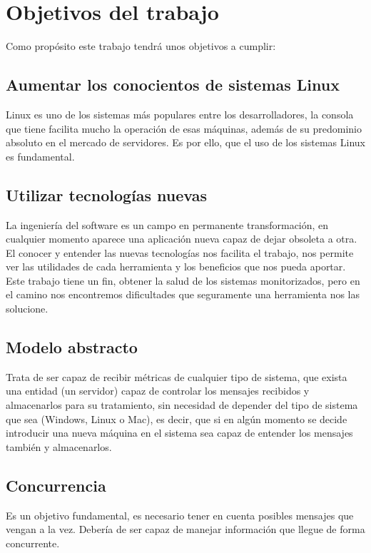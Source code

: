 \documentclass[ spanish, a4paper, 12pt, oneside]{report}
\begin{document}
\section{Objetivos del trabajo}
Como propósito este trabajo tendrá unos objetivos a cumplir:\\

\subsection{Aumentar los conocientos de sistemas Linux}
Linux es uno de los sistemas más populares entre los desarrolladores, la consola que tiene facilita mucho la operación de esas 
máquinas, además de su predominio absoluto en el mercado de servidores. Es por ello, que el uso de los sistemas Linux es fundamental.\\

\subsection{Utilizar tecnologías nuevas}
La ingeniería del software es un campo en permanente transformación, en cualquier momento aparece una aplicación nueva capaz de dejar obsoleta a otra. 
El conocer y entender las nuevas tecnologías nos facilita el trabajo, nos permite ver las utilidades de cada herramienta y los
beneficios que nos pueda aportar. \\

Este trabajo tiene un fin, obtener la salud de los sistemas monitorizados, pero en el camino nos encontremos dificultades que 
seguramente una herramienta nos las solucione. \\

\subsection{Modelo abstracto}
Trata de ser capaz de recibir métricas de cualquier tipo de sistema, que exista una entidad (un servidor) capaz de controlar los mensajes recibidos y almacenarlos 
para su tratamiento, sin necesidad de depender del tipo de sistema que sea (Windows, Linux o Mac), es decir, que si en algún momento se decide introducir 
una nueva máquina en el sistema sea capaz de entender los mensajes también y almacenarlos. \\

\subsection{Concurrencia}
Es un objetivo fundamental, es necesario tener en cuenta posibles mensajes que vengan a la vez. Debería de ser capaz de manejar información que llegue 
de forma concurrente. \\
\end{document}
